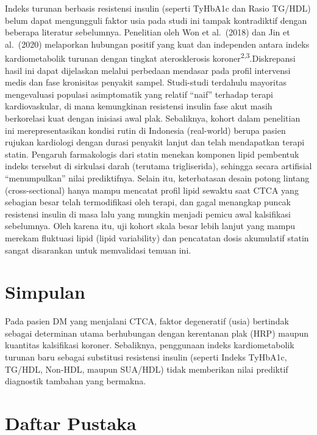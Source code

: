 \documentclass[
  indonesian,
]{agujournal2019}
\begin{document}
Indeks turunan berbasis resistensi insulin (seperti TyHbA1c dan Rasio
TG/HDL) belum dapat mengungguli faktor usia pada studi ini tampak
kontradiktif dengan beberapa literatur sebelumnya. Penelitian oleh Won
et al.~(2018) dan Jin et al.~(2020) melaporkan hubungan positif yang
kuat dan independen antara indeks kardiometabolik turunan dengan tingkat
aterosklerosis koroner\textsuperscript{2,3}.Diskrepansi hasil ini dapat
dijelaskan melalui perbedaan mendasar pada profil intervensi medis dan
fase kronisitas penyakit sampel. Studi-studi terdahulu mayoritas
mengevaluasi populasi asimptomatik yang relatif ``naif'' terhadap terapi
kardiovaskular, di mana kemungkinan resistensi insulin fase akut masih
berkorelasi kuat dengan inisiasi awal plak. Sebaliknya, kohort dalam
penelitian ini merepresentasikan kondisi rutin di Indonesia (real-world)
berupa pasien rujukan kardiologi dengan durasi penyakit lanjut dan telah
mendapatkan terapi statin. Pengaruh farmakologis dari statin menekan
komponen lipid pembentuk indeks tersebut di sirkulasi darah (terutama
trigliserida), sehingga secara artifisial ``menumpulkan'' nilai
prediktifnya. Selain itu, keterbatasan desain potong lintang
(cross-sectional) hanya mampu mencatat profil lipid sewaktu saat CTCA
yang sebagian besar telah termodifikasi oleh terapi, dan gagal menangkap
puncak resistensi insulin di masa lalu yang mungkin menjadi pemicu awal
kalsifikasi sebelumnya. Oleh karena itu, uji kohort skala besar lebih
lanjut yang mampu merekam fluktuasi lipid (lipid variability) dan
pencatatan dosis akumulatif statin sangat disarankan untuk memvalidasi
temuan ini.

\section{Simpulan}\label{simpulan}

Pada pasien DM yang menjalani CTCA, faktor degeneratif (usia) bertindak
sebagai determinan utama berhubungan dengan kerentanan plak (HRP) maupun
kuantitas kalsifikasi koroner. Sebaliknya, penggunaan indeks
kardiometabolik turunan baru sebagai substitusi resistensi insulin
(seperti Indeks TyHbA1c, TG/HDL, Non-HDL, maupun SUA/HDL) tidak
memberikan nilai prediktif diagnostik tambahan yang bermakna.

\section{Daftar Pustaka}\label{daftar-pustaka}
\end{document}
